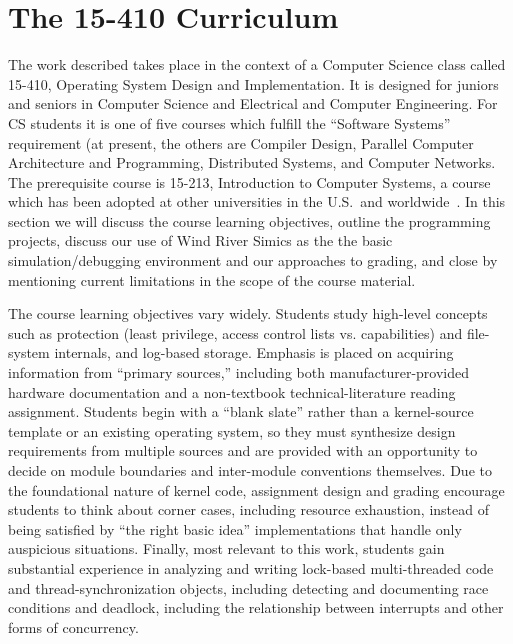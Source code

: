 \section{The 15-410 Curriculum}
\label{sec:curriculum}

The work described takes place in the context of a
Computer Science class called
15-410, Operating System Design and Implementation.
It is designed for juniors and seniors in Computer Science
and Electrical and Computer Engineering.
For CS students it is one of five courses which fulfill
the ``Software Systems'' requirement (at present, the others
are Compiler Design,
Parallel Computer Architecture and Programming,
Distributed Systems,
and Computer Networks.
The prerequisite course is 15-213,
Introduction to Computer Systems,
a course which has been adopted at other
universities in the U.S.\ and worldwide~\cite{sigcse01:CSaPP}.
In this section we will discuss the course learning
objectives,
outline the programming projects,
discuss our use of Wind River Simics as the
the basic simulation/debugging environment
and our approaches to grading,
and close by mentioning current limitations in the scope
of the course material.

The course learning objectives vary widely.
%
Students study high-level concepts
such as protection (least privilege, access control lists vs.
capabilities)
and
file-system internals,
and log-based storage.
%
Emphasis is placed on acquiring information from ``primary sources,''
including both manufacturer-provided hardware documentation
and a non-textbook technical-literature reading assignment.
%
Students begin with a ``blank slate'' rather than a
kernel-source template or an existing operating system,
so they must synthesize design requirements from multiple sources
and are provided with an opportunity to 
decide on module boundaries and inter-module conventions
themselves.
%
Due to the foundational nature of kernel code,
assignment design and grading encourage students to
think about corner cases, including resource exhaustion,
instead of being satisfied by ``the right basic idea''
implementations that handle only auspicious situations.
%
Finally, most relevant to this work,
students gain substantial experience in
analyzing and writing lock-based multi-threaded code and
thread-synchronization objects, including detecting and documenting race conditions and deadlock,
including
the relationship between interrupts and other forms of concurrency.

